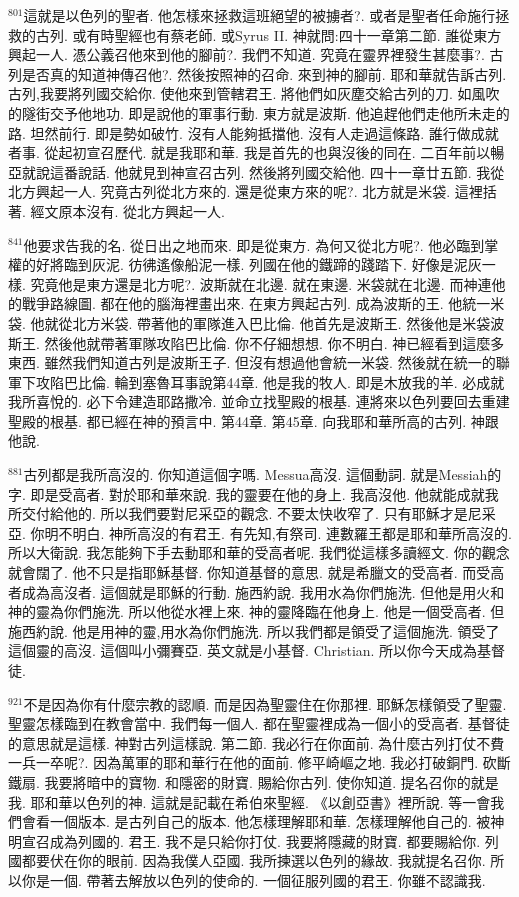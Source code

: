 \documentclass{book}
\begin{document}
$^{801}$這就是以色列的聖者.
他怎樣來拯救這班絕望的被擄者?.
或者是聖者任命施行拯救的古列.
或有時聖經也有蔡老師.
或Syrus II.
神就問:四十一章第二節.
誰從東方興起一人.
憑公義召他來到他的腳前?.
我們不知道.
究竟在靈界裡發生甚麼事?.
古列是否真的知道神傳召他?.
然後按照神的召命.
來到神的腳前.
耶和華就告訴古列.
古列,我要將列國交給你.
使他來到管轄君王.
將他們如灰塵交給古列的刀.
如風吹的隧街交予他地功.
即是說他的軍事行動.
東方就是波斯.
他追趕他們走他所未走的路.
坦然前行.
即是勢如破竹.
沒有人能夠抵擋他.
沒有人走過這條路.
誰行做成就者事.
從起初宣召歷代.
就是我耶和華.
我是首先的也與沒後的同在.
二百年前以暢亞就說這番說話.
他就見到神宣召古列.
然後將列國交給他.
四十一章廿五節.
我從北方興起一人.
究竟古列從北方來的.
還是從東方來的呢?.
北方就是米袋.
這裡括著.
經文原本沒有.
從北方興起一人.

$^{841}$他要求告我的名.
從日出之地而來.
即是從東方.
為何又從北方呢?.
他必臨到掌權的好將臨到灰泥.
彷彿遙像船泥一樣.
列國在他的鐵蹄的踐踏下.
好像是泥灰一樣.
究竟他是東方還是北方呢?.
波斯就在北邊.
就在東邊.
米袋就在北邊.
而神連他的戰爭路線圖.
都在他的腦海裡畫出來.
在東方興起古列.
成為波斯的王.
他統一米袋.
他就從北方米袋.
帶著他的軍隊進入巴比倫.
他首先是波斯王.
然後他是米袋波斯王.
然後他就帶著軍隊攻陷巴比倫.
你不仔細想想.
你不明白.
神已經看到這麼多東西.
雖然我們知道古列是波斯王子.
但沒有想過他會統一米袋.
然後就在統一的聯軍下攻陷巴比倫.
輪到塞魯耳事說第44章.
他是我的牧人.
即是木放我的羊.
必成就我所喜悅的.
必下令建造耶路撒冷.
並命立找聖殿的根基.
連將來以色列要回去重建聖殿的根基.
都已經在神的預言中.
第44章.
第45章.
向我耶和華所高的古列.
神跟他說.

$^{881}$古列都是我所高沒的.
你知道這個字嗎.
Messua高沒.
這個動詞.
就是Messiah的字.
即是受高者.
對於耶和華來說.
我的靈要在他的身上.
我高沒他.
他就能成就我所交付給他的.
所以我們要對尼采亞的觀念.
不要太快收窄了.
只有耶穌才是尼采亞.
你明不明白.
神所高沒的有君王.
有先知,有祭司.
連數羅王都是耶和華所高沒的.
所以大衛說.
我怎能夠下手去動耶和華的受高者呢.
我們從這樣多讀經文.
你的觀念就會闊了.
他不只是指耶穌基督.
你知道基督的意思.
就是希臘文的受高者.
而受高者成為高沒者.
這個就是耶穌的行動.
施西約說.
我用水為你們施洗.
但他是用火和神的靈為你們施洗.
所以他從水裡上來.
神的靈降臨在他身上.
他是一個受高者.
但施西約說.
他是用神的靈,用水為你們施洗.
所以我們都是領受了這個施洗.
領受了這個靈的高沒.
這個叫小彌賽亞.
英文就是小基督.
Christian.
所以你今天成為基督徒.

$^{921}$不是因為你有什麼宗教的認順.
而是因為聖靈住在你那裡.
耶穌怎樣領受了聖靈.
聖靈怎樣臨到在教會當中.
我們每一個人.
都在聖靈裡成為一個小的受高者.
基督徒的意思就是這樣.
神對古列這樣說.
第二節.
我必行在你面前.
為什麼古列打仗不費一兵一卒呢?.
因為萬軍的耶和華行在他的面前.
修平崎嶇之地.
我必打破銅門.
砍斷鐵扇.
我要將暗中的寶物.
和隱密的財寶.
賜給你古列.
使你知道.
提名召你的就是我.
耶和華以色列的神.
這就是記載在希伯來聖經.
《以創亞書》裡所說.
等一會我們會看一個版本.
是古列自己的版本.
他怎樣理解耶和華.
怎樣理解他自己的.
被神明宣召成為列國的.
君王.
我不是只給你打仗.
我要將隱藏的財寶.
都要賜給你.
列國都要伏在你的眼前.
因為我僕人亞國.
我所揀選以色列的緣故.
我就提名召你.
所以你是一個.
帶著去解放以色列的使命的.
一個征服列國的君王.
你雖不認識我.
\end{document}
